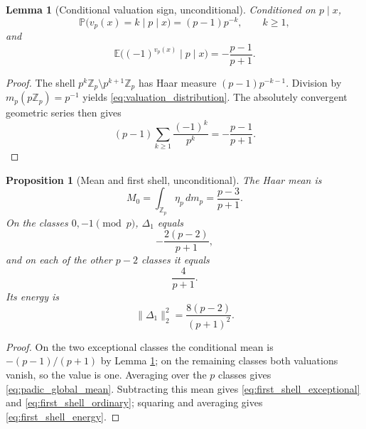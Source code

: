 \documentclass[11pt]{amsart}
\numberwithin{equation}{section}
\theoremstyle{plain}
\newtheorem{proposition}[theorem]{Proposition}
\newtheorem{lemma}[theorem]{Lemma}
\theoremstyle{definition}
\theoremstyle{remark}
\newcommand{\Z}{\mathbb Z}
\newcommand{\E}{\mathbb E}
\newcommand{\Prob}{\mathbb P}
\begin{document}
\begin{lemma}[Conditional valuation sign, unconditional]
\label{lem:conditional_valuation}
Conditioned on $p\mid x$,
\begin{equation}
\Prob\bigl(v_p(x)=k\mid p\mid x\bigr)=(p-1)p^{-k},
\qquad k\ge1,
\label{eq:valuation_distribution}
\end{equation}
and
\begin{equation}
\E\bigl((-1)^{v_p(x)}\mid p\mid x\bigr)
=-\frac{p-1}{p+1}.
\label{eq:conditional_valuation_mean}
\end{equation}
\end{lemma}

\begin{proof}
The shell $p^k\Z_p\setminus p^{k+1}\Z_p$ has Haar measure $(p-1)p^{-k-1}$.  Division by $m_p(p\Z_p)=p^{-1}$ yields \eqref{eq:valuation_distribution}.  The absolutely convergent geometric series then gives
\begin{equation}
(p-1)\sum_{k\ge1}\frac{(-1)^k}{p^k}=-\frac{p-1}{p+1}.
\label{eq:conditional_valuation_series}
\end{equation}
\end{proof}

\begin{proposition}[Mean and first shell, unconditional]
\label{prop:padic_mean_first_shell}
The Haar mean is
\begin{equation}
M_0=\int_{\Z_p}\eta_p\,dm_p=\frac{p-3}{p+1}.
\label{eq:padic_global_mean}
\end{equation}
On the classes $0,-1\pmod p$, $\Delta_1$ equals
\begin{equation}
-\frac{2(p-2)}{p+1},
\label{eq:first_shell_exceptional}
\end{equation}
and on each of the other $p-2$ classes it equals
\begin{equation}
\frac4{p+1}.
\label{eq:first_shell_ordinary}
\end{equation}
Its energy is
\begin{equation}
\|\Delta_1\|_2^2=\frac{8(p-2)}{(p+1)^2}.
\label{eq:first_shell_energy}
\end{equation}
\end{proposition}

\begin{proof}
On the two exceptional classes the conditional mean is $-(p-1)/(p+1)$ by Lemma \ref{lem:conditional_valuation}; on the remaining classes both valuations vanish, so the value is one.  Averaging over the $p$ classes gives \eqref{eq:padic_global_mean}.  Subtracting this mean gives \eqref{eq:first_shell_exceptional} and \eqref{eq:first_shell_ordinary}; squaring and averaging gives \eqref{eq:first_shell_energy}.
\end{proof}
\end{document}
